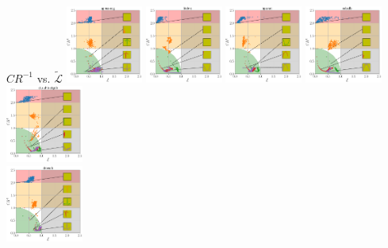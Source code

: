 \documentclass{beamer}
\begin{document}
\begin{frame}[c]{$CR^{-1}$ \textlatin{vs}. $\tilde{\mathcal{L}}$}
	\includegraphics[width=0.19\textwidth]{"images_mean_inverse_compression_ratio_vs_mean_reconstruction_loss_variable_kernel_size_list/apnea-ecg"}
	\includegraphics[width=0.19\textwidth]{"images_mean_inverse_compression_ratio_vs_mean_reconstruction_loss_variable_kernel_size_list/bidmc"}
	\includegraphics[width=0.19\textwidth]{"images_mean_inverse_compression_ratio_vs_mean_reconstruction_loss_variable_kernel_size_list/bpssrat"}
	\includegraphics[width=0.19\textwidth]{"images_mean_inverse_compression_ratio_vs_mean_reconstruction_loss_variable_kernel_size_list/cebsdb"}
	\includegraphics[width=0.19\textwidth]{"images_mean_inverse_compression_ratio_vs_mean_reconstruction_loss_variable_kernel_size_list/ctu-uhb-ctgdb"}
	\\
	\includegraphics[width=0.19\textwidth]{"images_mean_inverse_compression_ratio_vs_mean_reconstruction_loss_variable_kernel_size_list/drivedb"}

\end{frame}
\end{document}
